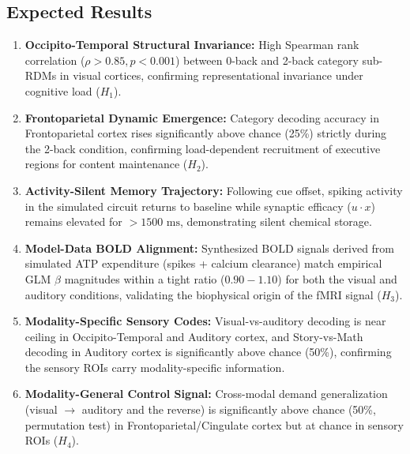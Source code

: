 \documentclass[11pt,a4paper]{article}
\begin{document}
\begin{center}
\end{center}

\subsection{Expected Results}

\begin{enumerate}
    \item \textbf{Occipito-Temporal Structural Invariance:} High Spearman rank correlation ($\rho > 0.85, p < 0.001$) between 0-back and 2-back category sub-RDMs in visual cortices, confirming representational invariance under cognitive load ($H_1$).
    \item \textbf{Frontoparietal Dynamic Emergence:} Category decoding accuracy in Frontoparietal cortex rises significantly above chance (25\%) strictly during the 2-back condition, confirming load-dependent recruitment of executive regions for content maintenance ($H_2$).
    \item \textbf{Activity-Silent Memory Trajectory:} Following cue offset, spiking activity in the simulated circuit returns to baseline while synaptic efficacy ($u \cdot x$) remains elevated for $>1500\text{ ms}$, demonstrating silent chemical storage.
    \item \textbf{Model-Data BOLD Alignment:} Synthesized BOLD signals derived from simulated ATP expenditure (spikes + calcium clearance) match empirical GLM $\beta$ magnitudes within a tight ratio ($0.90 - 1.10$) for both the visual and auditory conditions, validating the biophysical origin of the fMRI signal ($H_3$).
    \item \textbf{Modality-Specific Sensory Codes:} Visual-vs-auditory decoding is near ceiling in Occipito-Temporal and Auditory cortex, and Story-vs-Math decoding in Auditory cortex is significantly above chance (50\%), confirming the sensory ROIs carry modality-specific information.
    \item \textbf{Modality-General Control Signal:} Cross-modal demand generalization (visual $\rightarrow$ auditory and the reverse) is significantly above chance (50\%, permutation test) in Frontoparietal/Cingulate cortex but at chance in sensory ROIs ($H_4$).
\end{enumerate}
\end{document}
